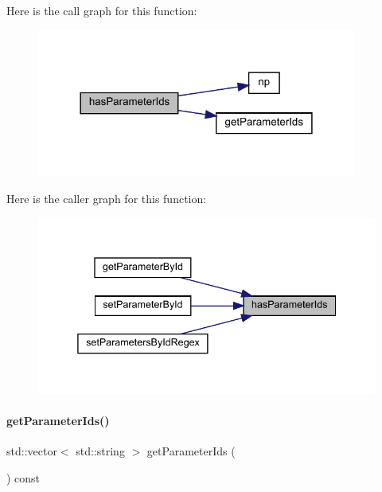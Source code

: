 Here is the call graph for this function\+:
\nopagebreak
\begin{figure}[H]
\begin{center}
\leavevmode
\includegraphics[width=298pt]{classamici_1_1_model_a2bd3836db435507277d0e5c9fa139cb9_cgraph}
\end{center}
\end{figure}
Here is the caller graph for this function\+:
\nopagebreak
\begin{figure}[H]
\begin{center}
\leavevmode
\includegraphics[width=338pt]{classamici_1_1_model_a2bd3836db435507277d0e5c9fa139cb9_icgraph}
\end{center}
\end{figure}
\mbox{\label{classamici_1_1_model_a2c3cf99676168a01fccf6f4217f85297}} 
\paragraph{\texorpdfstring{getParameterIds()}{getParameterIds()}}
{\footnotesize\ttfamily std\+::vector$<$ std\+::string $>$ get\+Parameter\+Ids (\begin{DoxyParamCaption}{ }\end{DoxyParamCaption}) const\hspace{0.3cm}{\ttfamily [virtual]}}

